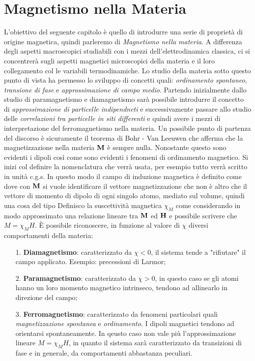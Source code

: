 \section{Magnetismo nella Materia}
L'obiettivo del seguente capitolo è quello di introdurre una serie di proprietà di origine magnetica, quindi parleremo di \textit{Magnetismo nella materia}. A differenza degli aspetti macroscopici studiabili con i mezzi dell'elettrodinamica classica, ci si concentrerà sugli aspetti magnetici microscopici della materia e il loro collegamento col le variabili termodinamiche. Lo studio della materia sotto questo punto di vista ha permesso lo sviluppo di concetti quali: \textit{ordinamento spontaneo}, \textit{transione di fase} e \textit{approssimazione di campo medio}.
Partendo inizialmente dallo studio di paramagnetismo e diamagnetismo sarà possibile introdurre il concetto di \textit{approssimazione di particelle indipendneti} e successivamente passare allo studio delle \textit{correlazioni tra particelle in siti differenti} e quindi avere i mezzi di interpretazione del ferromagnetismo nella materia. Un possibile punto di partenza del discorso è sicuramente il teorema di Bohr - Van Leeuwen che afferma che la magnetizzazione nella materia ${\it\bf M}$ è sempre nulla. Nonostante questo sono evidenti i dipoli così come sono evidenti i fenomeni di ordinamento magnetico. Si inizi col definire la nomenclatura che verrà usata, per esempio tutto verrà scritto in unità c.g.s. In questo modo il campo di induzione magnetica è definito come
dove con ${\it\bf M}$ si vuole identificare il vettore magnetizzazione che non è altro che il vettore di momento di dipolo di ogni singolo atomo, mediato sul volume, quindi una cosa del tipo
Definisco la suscettività magnetica $\chi_M$ come 
considerando in modo approssimato una relazione lineare tra $\it\bf M$ ed $\it\bf H$ e possibile scrivere che $M = \chi_M H$. \`E possibile riconoscere, in funzione al valore di $\chi$ diversi comportamenti della materia:
\begin{itemize}
	\item[1.] \textbf{Diamagnetismo}: caratterizzato da $\chi<0$, il sistema tende a "rifiutare" il campo applicato. Esempio: precessioni di Larmor;
	\item[2.] \textbf{Paramagnetismo}: caratterizzato da $\chi>0$, in questo caso se gli  atomi hanno un loro momento magnetico intrinseco, tendono ad allinearlo in direzione del campo;
	\item[3.] \textbf{Ferromagnetismo}: caratterizzato da fenomeni particolari quali \textit{magnetizzazione spontanea} e \textit{ordinamento}. I dipoli magnetici tendono ad orientarsi spontaneamente. In qeusto caso non vale più l'approssimazione lineare $M = \chi_M H$, in quanto il sistema sarà caratterizzato da transizioni di fase e in generale, da comportamenti abbastanza peculiari.
\end{itemize}
